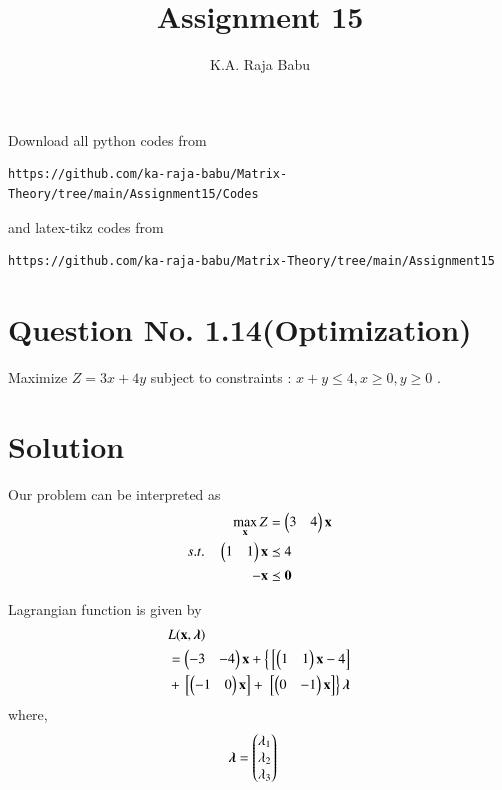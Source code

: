 \documentclass[journal,12pt,twocolumn]{IEEEtran}
\begin{document}
\makeatother
\let\StandardTheFigure\thefigure
\let\vec\mathbf
\renewcommand{\thefigure}{\theproblem}
\def\putbox#1#2#3{\makebox[0in][l]{\makebox[#1][l]{}\raisebox{\baselineskip}[0in][0in]{\raisebox{#2}[0in][0in]{#3}}}}
     \def\rightbox#1{\makebox[0in][r]{#1}}
     \def\centbox#1{\makebox[0in]{#1}}
     \def\topbox#1{\raisebox{-\baselineskip}[0in][0in]{#1}}
     \def\midbox#1{\raisebox{-0.5\baselineskip}[0in][0in]{#1}}
\vspace{3cm}
\title{Assignment 15}
\author{K.A. Raja Babu}
\maketitle
\newpage
\bigskip
\renewcommand{\thefigure}{\theenumi}
\renewcommand{\thetable}{\theenumi}
Download all python codes from 
\begin{lstlisting}
https://github.com/ka-raja-babu/Matrix-Theory/tree/main/Assignment15/Codes
\end{lstlisting}
%
and latex-tikz codes from 
%
\begin{lstlisting}
https://github.com/ka-raja-babu/Matrix-Theory/tree/main/Assignment15
\end{lstlisting}
%
\section{Question No. 1.14(Optimization)}

Maximize $Z=3x+4y$ subject to constraints : $x+y \leq 4,x \geq 0,y \geq 0$ .

\section{Solution}

Our problem can be interpreted as
\begin{align}
        \max_{\vec{x}} Z &= \myvec{3 & 4}\vec{x}\\
        s.t. \quad 
        \myvec{1 & 1 }\vec{x} &\preceq 4 \\
        -\vec{x} &\preceq \vec{0}
\end{align}

Lagrangian function is given by
\begin{equation}
\begin{aligned}
    &L(\vec{x},\boldsymbol{\lambda}) \\ &= \myvec{-3 & -4}\vec{x}+\lcbrak{\sbrak{\myvec{1 & 1}\vec{x}-4}} \\ &+\sbrak{\myvec{-1 & 0}\vec{x}} +\rcbrak{\sbrak{\myvec{0 & -1}\vec{x}}}\boldsymbol{\lambda}
\end{aligned}
\end{equation}
where,
\begin{align}
    \boldsymbol{\lambda} &= \begin{pmatrix}\lambda_1 \\ \lambda_2 \\ \lambda_3 \end{pmatrix}
\end{align}
\end{document}
